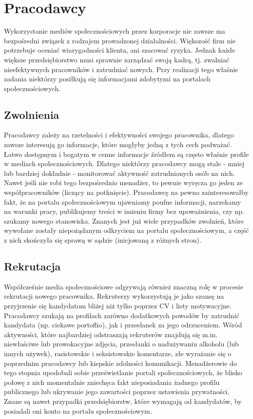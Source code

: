 \documentclass[polish]{kbk}
\begin{document}
\section{Pracodawcy \cite{social-hiring}}
Wykorzystanie mediów społecznościowych przez korporacje nie zawsze ma bezpośredni związek z rodzajem prowadzonej działalności. Większość firm nie potrzebuje oceniać wiarygodności klienta, ani szacować ryzyka. Jednak każde większe przedsiębiorstwo musi sprawnie zarządzać swoją kadrą, tj. zwalniać nieefektywnych pracowników i zatrudniać nowych. Przy realizacji tego właśnie zadania niektórzy posiłkują się informacjami zdobytymi na portalach społecznościowych.

\subsection{Zwolnienia}
Pracodawcy zależy na rzetelności i efektywności swojego pracownika, dlatego zawsze interesują go informacje, które mogłyby jedną z tych cech podważać. Łatwo dostępnym i bogatym w cenne informacje źródłem są często właśnie profile w mediach społecznościowych. Dlatego niektórzy pracodawcy mogą stale - mniej lub bardziej dokładnie - monitorować aktywność zatrudnionych osób na nich. Nawet jeśli nie robi tego bezpośrednio menadżer, to pewnie wyręcza go jeden ze współpracowników (liczący na potknięcie). Pracodawcę na pewno zainteresowałby fakt, że na portalu społecznościowym ujawniamy poufne informacji, narzekamy na warunki pracy, publikujemy treści w imieniu firmy bez upoważnienia, czy np. szukamy nowego stanowiska. Znanych jest już wiele przypadków zwolnień, które wywołane zostały niepożądanym odkryciem na portalu społecznościowym, a część z nich skończyła się sprawą w sądzie (inicjowaną z różnych stron).

\subsection{Rekrutacja}
Współcześnie media społecznościowe odgrywają również znaczną rolę w procesie rekrutacji nowego pracownika. Rekruterzy wykorzystują je jako szansę na przyjrzenie się kandydatom bliżej niż tylko poprzez CV i listy motywacyjne. Pracodawcy szukają na profilach zarówno dodatkowych powodów by zatrudnić kandydata (np. ciekawe portoflio), jak i przesłanek za jego odrzuceniem. Wśród aktywności, które najbardziej odstraszają rekruterów znajdują się m.in. niewłaściwe lub prowokacyjne zdjęcia, przesłanki o nadużywaniu alkoholu (lub innych używek), rasistowskie i seksistowskie komentarze, złe wyrażanie się o poprzednim pracodawcy lub kiepskie zdolności komunikacji. Menadżerowie do tego stopnia upodobali sobie prześwietlanie portali społecznościowych, że blisko połowę z nich momentalnie zniechęca fakt nieposiadania żadnego profilu publicznego lub ukrywanie jego zawartości poprzez ustawienia prywatności. Znane są nawet przypadki przedsiębiorstw, które wymagają od kandydatów, by posiadali oni konto na portalu społecznościowym.
\end{document}

